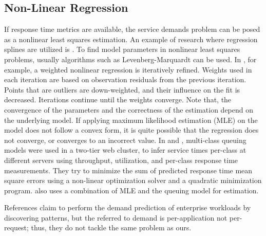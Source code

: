  \subsection{Non-Linear Regression}
If response time metrics are available, the service demands problem can be posed as a nonlinear least squares estimation. 
  An example of research where regression splines are utilized is \cite{courtois_using_2000}. To find model parameters in nonlinear least squares problems, usually algorithms such as Levenberg-Marquardt \cite{wild_nonlinear_2003,dumouchel1989integrating} can be used. In \cite{dumouchel1989integrating}, for example, a weighted nonlinear regression is iteratively refined. Weights used in each iteration are based on observation residuals from the previous iteration. Points that are outliers are down-weighted, and their influence on the fit is decreased. Iterations continue until the weights converge. Note that, the convergence of the parameters and the correctness of the estimation depend on the underlying model. If applying maximum likelihood estimation (MLE) on the model does not follow a convex form, it is quite possible that the regression does not converge, or converges to an incorrect value.  %
% 
	In \cite{zhang_workload_2002} and \cite{liu_parameter_2006}, multi-class queuing models were used in a two-tier web cluster, to infer service times per-class at different servers using throughput, utilization, and per-class response time measurements. They try to minimize the sum of predicted response time mean square errors using a non-linear optimization solver and a quadratic minimization program. \cite{kraft_estimating_2009} also uses a combination of MLE and the queuing model for estimation.  

 References \cite{gmach_workload_2007,gmach_capacity_2007} claim to perform the demand prediction of enterprise workloads by discovering patterns, but the referred to demand is per-application not per-request; thus, they do not tackle the same problem as ours. 
 
